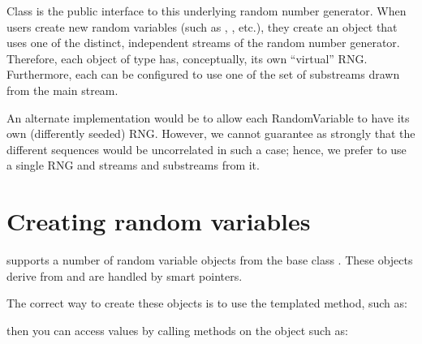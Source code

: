 \documentclass[letterpaper,10pt,english]{sphinxmanual}
\renewcommand{\sphinxcode}[1]{\texttt{\small{#1}}}
\begin{document}
Class \sphinxcode{} is the public interface to this
underlying random number generator.  When users create new random variables
(such as \sphinxcode{},
\sphinxcode{}, etc.), they create an object that uses
one of the distinct, independent streams of the random number generator.
Therefore, each object of type \sphinxcode{} has,
conceptually, its own “virtual” RNG.  Furthermore, each
\sphinxcode{} can be configured to use one of the set of
substreams drawn from the main stream.

An alternate implementation would be to allow each RandomVariable to have its
own (differently seeded) RNG.  However, we cannot guarantee as strongly that the
different sequences would be uncorrelated in such a case; hence, we prefer to
use a single RNG and streams and substreams from it.


\section{Creating random variables}
\label{\detokenize{random-variables:creating-random-variables}}\label{\detokenize{random-variables:seeding-and-independent-replications}}
 supports a number of random variable objects from the base class
\sphinxcode{}.  These objects derive from
\sphinxcode{} and are handled by smart pointers.

The correct way to create these objects is to use the templated
 method, such as:

\begin{sphinxVerbatim}[commandchars=\\\{\}]
    
\end{sphinxVerbatim}

then you can access values by calling methods on the object such as:

\begin{sphinxVerbatim}[commandchars=\\\{\}]
   
\end{sphinxVerbatim}
\end{document}
